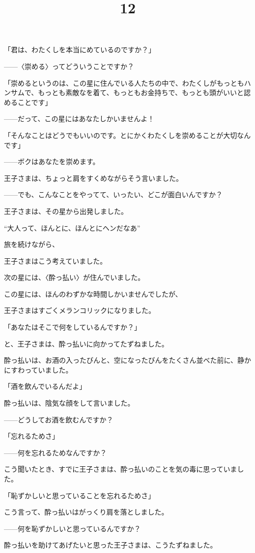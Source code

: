 「君は、わたくしを本当にめているのですか？」

——〈崇める〉ってどういうことですか？

「崇めるというのは、この星に住んでいる人たちの中で、わたくしがもっともハンサムで、もっとも素敵なを着て、もっともお金持ちで、もっとも頭がいいと認めることです」

——だって、この星にはあなたしかいませんよ！

「そんなことはどうでもいいのです。とにかくわたくしを崇めることが大切なんです」

——ボクはあなたを崇めます。

王子さまは、ちょっと肩をすくめながらそう言いました。

——でも、こんなことをやってて、いったい、どこが面白いんですか？

王子さまは、その星から出発しました。

“大人って、ほんとに、ほんとにヘンだなあ”

旅を続けながら、

王子さまはこう考えていました。
\title{12}


次の星には、〈酔っ払い〉が住んでいました。

この星には、ほんのわずかな時間しかいませんでしたが、

王子さまはすごくメランコリックになりました。

「あなたはそこで何をしているんですか？」

と、王子さまは、酔っ払いに向かってたずねました。

酔っ払いは、お酒の入ったびんと、空になったびんをたくさん並べた前に、静かにすわっていました。


「酒を飲んでいるんだよ」

酔っ払いは、陰気な顔をして言いました。

——どうしてお酒を飲むんですか？

「忘れるためさ」

——何を忘れるためなんですか？

こう聞いたとき、すでに王子さまは、酔っ払いのことを気の毒に思っていました。

「恥ずかしいと思っていることを忘れるためさ」

こう言って、酔っ払いはがっくり肩を落としました。

——何を恥ずかしいと思っているんですか？

酔っ払いを助けてあげたいと思った王子さまは、こうたずねました。


